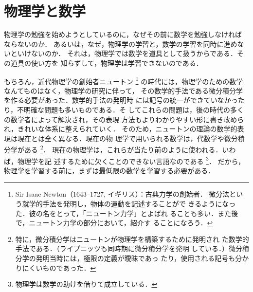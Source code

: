 ﻿%

        \section{物理学と数学}
            物理学の勉強を始めようとしているのに，なぜその前に数学を勉強しなければ
            ならないのか．
            あるいは，なぜ，物理学の学習と，数学の学習を同時に進めないといけないのか．
            それは，物理学では数学を道具として扱うからである．その道具の使い方を
            知らずして，物理学は学習できないのである．

            もちろん，近代物理学の創始者ニュートン
                \footnote{
                    Sir Isaac Newton（1643--1727, イギリス）：古典力学の創始者．
                    微分法という就学的手法を発明し，物体の運動を記述することがで
                    きるようになった．彼の名をとって，「ニュートン力学」とよばれ
                    ることも多い．また後で，ニュートン力学の部分において，紹介す
                    ることになろう．
                }
            の時代には，物理学のための数学なんてものはなく，物理学の研究に伴って，
            その数学的手法である微分積分学を作る必要があった．数学的手法の発明時
            には記号の統一ができていなかったり，不明確な問題も多いものである．そ
            してこれらの問題は，後の時代の多くの数学者によって解決され，その表現
            方法もよりわかりやすい形に書き改められ，きれいな体系に整えられていく．
            そのため，ニュートンの理論の数学的表現は現在とは全く異なる．現在の物
            理学で用いられる数学は，代数学や微分積分学がある
                \footnote{
                    特に，微分積分学はニュートンが物理学を構築するために発明され
                    た数学的手法である．（ライプニッツも同時期に微分積分学を発明
                    している．）微分積分学の発明当時には，極限の定義が曖昧であっ
                    たり，使用される記号も分かりにくいものであった．
                }．
            現在の物理学は，これらが当たり前のように使われる．いわば，物理学を記
            述するために欠くことのできない言語なのである
                \footnote{
                    物理学は数学の助けを借りて成立している．
                }．
            だから，物理学を学習する前に，まずは最低限の数学を学習する必要がある．

